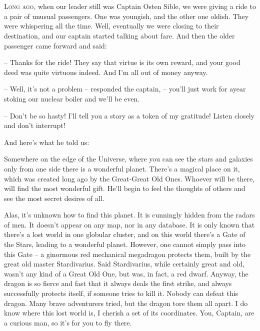 \documentclass[ebook,twoside,final,openright]{memoir}
\begin{document}
\chapter{}
\par
\lettrine{L}{ong ago,} when our leader still was Captain Osten Sible, we were giving a ride to a pair of unusual passengers. One was youngish, and the other one oldish. They were whispering all the time. Well, eventually we were closing to their destination, and our captain started talking about fare. And then the older passenger came forward and said: \par
\par
– Thanks for the ride! They say that virtue is its own reward, and your good deed was quite virtuous indeed. And I’m all out of money anyway.\par
– Well, it’s not a problem – responded the captain, – you’ll just work for ayear stoking our nuclear boiler and we’ll be even. \par
– Don’t be so hasty! I'll tell you a story as a token of my gratitude! Listen closely and don’t interrupt! \par
 And here’s what he told us:\par
\par
Somewhere on the edge of the Universe, where you can see the stars and galaxies only from one side there is a wonderful planet. There’s a magical place on it, which was created long ago by the Great-Great Old Ones. Whoever will be there, will find the most wonderful gift. He’ll begin to feel the thoughts of others and see the most secret desires of all. \par
Alas, it’s unknown how to find this planet. It is cunningly hidden from the radars of men. It doesn’t appear on any map, nor in any database. It is only known that there’s a lost world in one globular cluster, and on this world there’s a Gate of the Stars, leading to a wonderful planet. However, one cannot simply pass into this Gate – a ginormous red mechanical megadragon protects them, built by the great old master Stardivarius. Said Stardivarius, while certainly great and old, wasn’t any kind of a Great Old One, but was, in fact, a red dwarf. Anyway, the dragon is so fierce and fast that it always deals the first strike, and always successfully protects itself, if someone tries to kill it. Nobody can defeat this dragon. Many brave adventurers tried, but the dragon tore them all apart. I do know where this lost world is, I cherish a set of its coordinates. You, Captain, are a curious man, so it’s for you to fly there.\par
\end{document}
